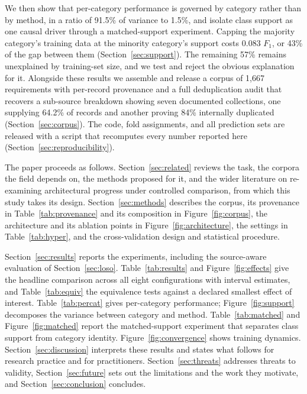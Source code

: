 \documentclass[11pt,a4paper]{article}
\begin{document}
We then show that per-category performance is governed by category rather than by method,
in a ratio of 91.5\% of variance to 1.5\%, and isolate class support as one
causal driver through a matched-support experiment. Capping the majority category's training data at the minority category's support costs 0.083 $F_1$, or 43\% of the
gap between them (Section~\ref{sec:support}). The remaining 57\% remains unexplained by training-set size, and we test and reject the obvious explanation for it. Alongside these
results we assemble and release a corpus of 1,667 requirements with per-record provenance
and a full deduplication audit that recovers a sub-source breakdown showing seven
documented collections, one supplying 64.2\% of records and another proving 84\%
internally duplicated
(Section~\ref{sec:corpus}). The code, fold assignments, and all prediction sets are
released with a script that recomputes every number reported here
(Section~\ref{sec:reproducibility}).

The paper proceeds as follows. Section~\ref{sec:related} reviews the task, the corpora the
field depends on, the methods proposed for it, and the wider literature on re-examining
architectural progress under controlled comparison, from which this study takes its design.
Section~\ref{sec:methods} describes the corpus, its provenance in Table~\ref{tab:provenance} and its composition in
Figure~\ref{fig:corpus}, the architecture and its ablation points in
Figure~\ref{fig:architecture}, the settings in Table~\ref{tab:hyper}, and the
cross-validation design and statistical procedure.

Section~\ref{sec:results} reports the experiments, including the source-aware evaluation of Section~\ref{sec:loso}. Table~\ref{tab:results} and Figure~\ref{fig:effects} give the headline comparison across
all eight configurations with interval estimates, and Table~\ref{tab:equiv} the equivalence
tests against a declared smallest effect of interest. Table~\ref{tab:percat} gives per-category performance;
Figure~\ref{fig:support} decomposes the variance between category and method.
Table~\ref{tab:matched} and Figure~\ref{fig:matched} report the matched-support experiment
that separates class support from category identity. Figure~\ref{fig:convergence} shows training dynamics. Section~\ref{sec:discussion} interprets these results and states what
follows for research practice and for practitioners. Section~\ref{sec:threats} addresses
threats to validity, Section~\ref{sec:future} sets out the limitations and the work they
motivate, and Section~\ref{sec:conclusion} concludes.
\end{document}
